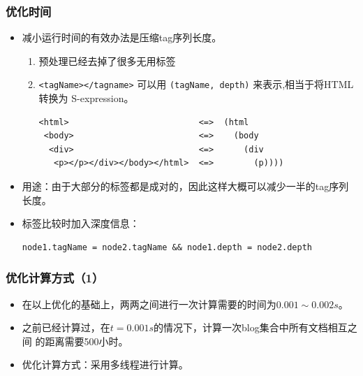 \documentclass[11pt,presentation]{beamer}
\begin{document}
\begin{frame}[fragile]
\frametitle{优化时间}
\label{sec-3-3}

\begin{itemize}
\item 减小运行时间的有效办法是压缩tag序列长度。
\begin{enumerate}
\item 预处理已经去掉了很多无用标签
\item \texttt{<tagName></tagname>} 可以用 \texttt{(tagName, depth)} 来表示,相当于将HTML转换为
        S-expression。\footnotesize

\begin{verbatim}
<html>                          <=>  (html
 <body>                         <=>    (body
  <div>                         <=>      (div
   <p></p></div></body></html>  <=>        (p))))
\end{verbatim}
        \normalsize
\end{enumerate}
\item 用途：由于大部分的标签都是成对的，因此这样大概可以减少一半的tag序列长度。
\item 标签比较时加入深度信息：
     \footnotesize

\begin{verbatim}
node1.tagName = node2.tagName && node1.depth = node2.depth
\end{verbatim}
     \normalsize
\end{itemize}
\end{frame}
\begin{frame}
\frametitle{优化计算方式（1）}
\label{sec-3-4}

\begin{itemize}
\item 在以上优化的基础上，两两之间进行一次计算需要的时间为\(0.001\sim 0.002s\)。
\item 之前已经计算过，在\(t=0.001s\)的情况下，计算一次blog集合中所有文档相互之间
     的距离需要500小时。
\item 优化计算方式：采用多线程进行计算。
\end{itemize}
\end{frame}
\end{document}
